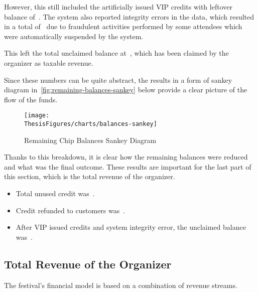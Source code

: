 However, this still included the artificially issued VIP credits with leftover balance of~.
The system also reported integrity errors in the data, which resulted in a total of~ due to fraudulent activities performed by some attendees which were automatically suspended by the system.

This left the total unclaimed balance at~, which has been claimed by the organizer as taxable revenue.

Since these numbers can be quite abstract, the results in a form of sankey diagram in~\autoref{fig:remaining-balances-sankey} below provide a clear picture of the flow of the funds.

\begin{figure}[H]
	\centering
	\texttt{[image: \\ThesisFigures/charts/balances-sankey]}
	\caption{Remaining Chip Balances Sankey Diagram}
	\label{fig:remaining-balances-sankey}
	\source
\end{figure}

Thanks to this breakdown, it is clear how the remaining balances were reduced and what was the final outcome.
These results are important for the last part of this section, which is the total revenue of the organizer.

\begin{keytakeaways}
	\begin{itemize}
		\item Total unused credit was~.
		\item Credit refunded to customers was~.
		\item After VIP issued credits and system integrity error, the unclaimed balance was~.
	\end{itemize}
\end{keytakeaways}


\subsection{Total Revenue of the Organizer}
\label{subsec:analysis-total-revenue}
\begin{rqbox}
	\textit{}
\end{rqbox}

The festival's financial model is based on a combination of revenue streams.

